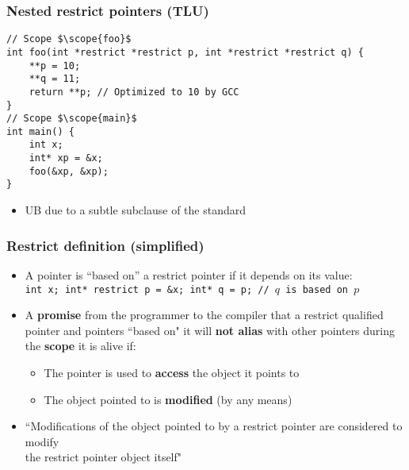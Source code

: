 \begin{frame}[fragile]
\frametitle{Nested restrict pointers (TLU)}
\begin{minipage}{0.7\textwidth}
\begin{verbatim}
// Scope $\scope{foo}$
int foo(int *restrict *restrict p, int *restrict *restrict q) {
    **p = 10;
    **q = 11;
    return **p; // Optimized to 10 by GCC
}
// Scope $\scope{main}$
int main() {
    int x;
    int* xp = &x;
    foo(&xp, &xp);
}
\end{verbatim}
\end{minipage}%
\begin{minipage}[t]{0.3\textwidth}
\end{minipage}

\begin{itemize}
    \item UB due to a subtle subclause of the standard
\end{itemize}

\end{frame}


\begin{frame}
\frametitle{Restrict definition (simplified)}
\begin{itemize}
    \item A pointer is ``based on'' a restrict pointer if it depends on its value: \\
        \texttt{int x; int* restrict p = &x; int* q = p; // $q$ is based on $p$}  
    \item A \textbf{promise} from the programmer to the compiler that a restrict qualified pointer and pointers ``based on" it will \textbf{not alias} with other pointers during the \textbf{scope} it is alive if:
            \begin{itemize}
                \item The pointer is used to \textbf{access} the object it points to
                \item The object pointed to is \textbf{modified} (by any means)
            \end{itemize}
    \item \colorbox{red!20}{``Modifications of the object pointed to by a restrict pointer are considered to modify} \\ \colorbox{red!20}{the restrict pointer object itself"}
\end{itemize}
\end{frame}




